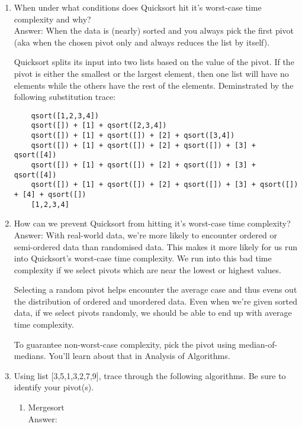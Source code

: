 \documentclass[11pt]{article}
\newenvironment{answer}{\large\lstset{basicstyle=\large\ttfamily}\color{white} \small{Answer:}\large}{}
\newenvironment{answer}{\large\lstset{basicstyle=\large\ttfamily}\color{red} \small{Answer:}\large}{}
\begin{document}
\begin{enumerate}
\item When under what conditions does Quicksort hit it's worst-case time complexity and why? \\
\begin{answer}
When the data is (nearly) sorted and you always pick the first pivot (aka when the chosen pivot only and always reduces the list by itself).

Quicksort splits its input into two lists based on the value of the pivot.  If the pivot is either the smallest or the largest element, then one list will have no elements while the others have the rest of the elements. Deminstrated by the following substitution trace:
	\begin{verbatim}
	qsort([1,2,3,4])
	qsort([]) + [1] + qsort([2,3,4])
	qsort([]) + [1] + qsort([]) + [2] + qsort([3,4])
	qsort([]) + [1] + qsort([]) + [2] + qsort([]) + [3] + qsort([4])
	qsort([]) + [1] + qsort([]) + [2] + qsort([]) + [3] + qsort([4])
	qsort([]) + [1] + qsort([]) + [2] + qsort([]) + [3] + qsort([]) + [4] + qsort([])
	[1,2,3,4]
	\end{verbatim}
\end{answer}



\item How can we prevent Quicksort from hitting it's worst-case time complexity? \\
\begin{answer}
With real-world data, we're more likely to encounter ordered or semi-ordered data than randomised data. This makes it more likely for us run into Quicksort's worst-case time complexity. We run into this bad time complexity if we select pivots which are near the lowest or highest values.

Selecting a random pivot helps encounter the average case and thus evens out the distribution of ordered and unordered data. Even when we're given sorted data, if we select pivots randomly, we should be able to end up with average time complexity.

To guarantee non-worst-case complexity, pick the pivot using median-of-medians.  You'll learn about that in Analysis of Algorithms.
\end{answer}


\pagebreak


\item Using list [3,5,1,3,2,7,9], trace through the following algorithms.  Be sure to identify your pivot(s). \\
\begin{enumerate}
	\item Mergesort \\
	\begin{answer}


\end{answer}
\end{enumerate}
\end{enumerate}
\end{document}
